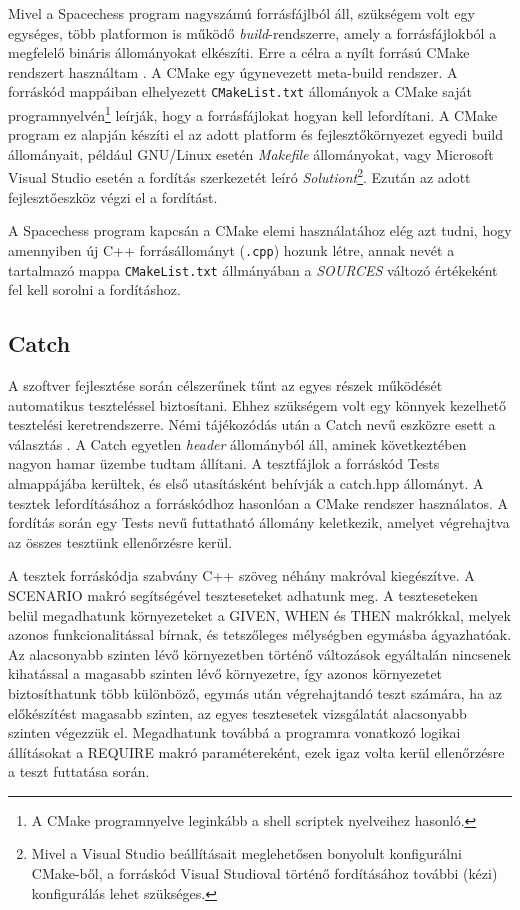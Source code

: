 \documentclass[12pt, twoside]{report}
\begin{document}
Mivel a Spacechess program nagyszámú forrásfájlból áll, szükségem volt egy egységes, több platformon is működő \emph{build}-rendszerre, amely a forrásfájlokból a megfelelő bináris állományokat elkészíti. Erre a célra a nyílt forrású CMake rendszert használtam \cite{cmake}. A CMake egy úgynevezett meta-build rendszer. A forráskód mappáiban elhelyezett {\tt CMakeList.txt} állományok a CMake saját programnyelvén\footnote{A CMake programnyelve leginkább a shell scriptek nyelveihez hasonló.} leírják, hogy a for\-rás\-fáj\-lo\-kat hogyan kell lefordítani. A CMake program ez alapján készíti el az adott platform és fejlesztőkörnyezet egyedi build állományait, például GNU/Linux esetén \emph{Makefile} állományokat, vagy Microsoft Visual Studio esetén a fordítás szerkezetét leíró \emph{Solutiont}\footnote{Mivel a Visual Studio beállításait meglehetősen bonyolult konfigurálni CMake-ből, a forráskód Visual Studioval történő fordításához további (kézi) konfigurálás lehet szükséges.}. Ezután az adott fejlesztőeszköz végzi el a fordítást.

A Spacechess program kapcsán a CMake elemi használatához elég azt tudni, hogy amennyiben új C++ forrásállományt ({\tt *.cpp}) hozunk létre, annak nevét a tartalmazó mappa {\tt CMakeList.txt} állmányában a \emph{SOURCES} változó értékeként fel kell sorolni a fordításhoz.

\subsection{Catch}

A szoftver fejlesztése során célszerűnek tűnt az egyes részek működését automatikus teszteléssel biztosítani. Ehhez szükségem volt egy könnyek kezelhető tesztelési keretrendszerre. Némi tájékozódás után a Catch nevű eszközre esett a választás \cite{catch}. A Catch egyetlen \emph{header} állományból áll, aminek következtében nagyon hamar üzembe tudtam állítani. A tesztfájlok a forráskód Tests almappájába kerültek, és első utasításként behívják a catch.hpp állományt. A tesztek lefordításához a forráskódhoz hasonlóan a CMake rendszer használatos. A fordítás során egy Tests nevű futtatható állomány keletkezik, amelyet végrehajtva az összes tesztünk ellenőrzésre kerül.

A tesztek forráskódja szabvány C++ szöveg néhány makróval kiegészítve. A SCENARIO makró segítségével teszteseteket adhatunk meg. A teszteseteken belül megadhatunk környezeteket a GIVEN, WHEN és THEN makrókkal, melyek azonos funkcionalitással bírnak, és tetszőleges mélységben egymásba ágyazhatóak. Az alacsonyabb szinten lévő környezetben történő változások egyáltalán nincsenek kihatással a magasabb szinten lévő környezetre, így azonos környezetet biztosíthatunk több különböző, egymás után végrehajtandó teszt számára, ha az előkészítést magasabb szinten, az egyes tesztesetek vizsgálatát alacsonyabb szinten végezzük el. Megadhatunk továbbá a programra vonatkozó logikai állításokat a REQUIRE makró paramétereként, ezek igaz volta kerül ellenőrzésre a teszt futtatása során.
\end{document}
